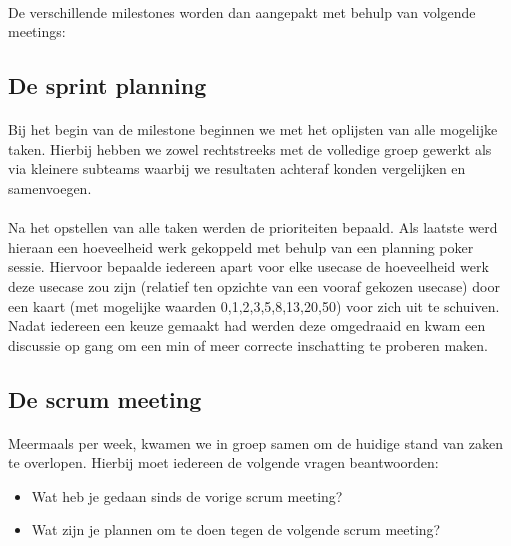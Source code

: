 \documentclass[11pt,twoside,a4paper]{article}
\begin{document}
	\paragraph{}
	De verschillende milestones worden dan aangepakt met behulp van volgende meetings:
	
	\subsection{De sprint planning}	
	
	\paragraph{}
	Bij het begin van de milestone beginnen we met het oplijsten van alle mogelijke taken. Hierbij hebben we zowel rechtstreeks met de volledige groep gewerkt als via kleinere subteams waarbij we resultaten achteraf konden vergelijken en samenvoegen.
	
	\paragraph{}
	Na het opstellen van alle taken werden de prioriteiten bepaald. Als laatste werd hieraan een hoeveelheid werk gekoppeld met behulp van een planning poker sessie. Hiervoor bepaalde iedereen apart voor elke usecase de hoeveelheid werk deze usecase zou zijn (relatief ten opzichte van een vooraf gekozen usecase) door een kaart (met mogelijke waarden 0,1,2,3,5,8,13,20,50) voor zich uit te schuiven. Nadat iedereen een keuze gemaakt had werden deze omgedraaid en kwam een discussie op gang om een min of meer correcte inschatting te proberen maken.
	
	\subsection{De scrum meeting}
	
	\paragraph{}
	Meermaals per week, kwamen we in groep samen om de huidige stand van zaken te overlopen. Hierbij moet iedereen de volgende vragen beantwoorden:
	
	\begin{itemize}
	\item Wat heb je gedaan sinds de vorige scrum meeting?
	\item Wat zijn je plannen om te doen tegen de volgende scrum meeting?
	\end{itemize}
	
\end{document}
